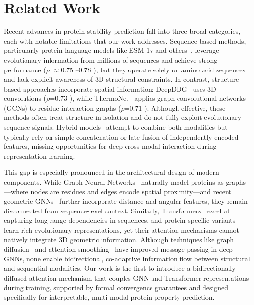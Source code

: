 \documentclass[11pt]{article}
\begin{document}
\section{Related Work}

Recent advances in protein stability prediction fall into three broad
categories, each with notable limitations that our work addresses.
Sequence-based methods, particularly protein language models like ESM-1v and
others~\cite{meier2021language,rives2021biological}, leverage evolutionary
information from millions of sequences and achieve strong performance ($\rho$ $\approx$0.75
–0.78 ), but they operate solely on amino acid sequences and lack explicit
awareness of 3D structural constraints. In contrast, structure-based approaches
incorporate spatial information: DeepDDG~\cite{cao2019deepddg} uses 3D
convolutions ($\rho$=0.73 ), while ThermoNet~\cite{li2020predicting} applies graph
convolutional networks (GCNs) to residue interaction graphs ($\rho$=0.71 ). Although
effective, these methods often treat structure in isolation and do not fully
exploit evolutionary sequence signals. Hybrid models~\cite{zhou2020mutation}
attempt to combine both modalities but typically rely on simple concatenation
or late fusion of independently encoded features, missing opportunities for
deep cross-modal interaction during representation learning.

This gap is especially pronounced in the architectural design of modern
components. While Graph Neural
Networks~\cite{kipf2017semi,velivckovic2018graph} naturally model proteins as
graphs—where nodes are residues and edges encode spatial proximity—and recent
geometric GNNs~\cite{jing2021learning} further incorporate distance and angular
features, they remain disconnected from sequence-level context. Similarly,
Transformers~\cite{vaswani2017attention} excel at capturing long-range
dependencies in sequences, and protein-specific
variants~\cite{rives2021biological,rao2021transformer} learn rich evolutionary
representations, yet their attention mechanisms cannot natively integrate 3D
geometric information. Although techniques like graph
diffusion~\cite{klicpera2019diffusion} and attention
smoothing~\cite{li2020deepergcn} have improved message passing in deep GNNs,
none enable bidirectional, co-adaptive information flow between structural and
sequential modalities. Our work is the first to introduce a bidirectionally
diffused attention mechanism that couples GNN and Transformer representations
during training, supported by formal convergence guarantees and designed
specifically for interpretable, multi-modal protein property prediction.
\end{document}
